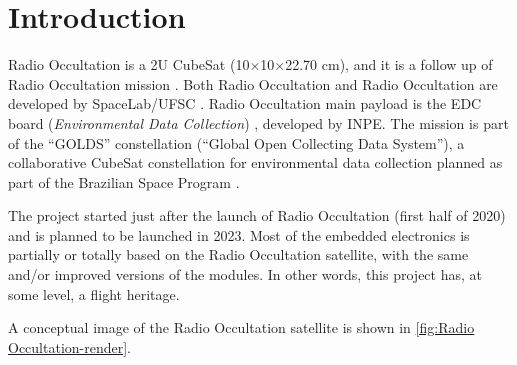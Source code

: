 %
%
%
%
%

%
%
%
%
%
%

\chapter{Introduction} \label{ch:introduction}

Radio Occultation is a 2U CubeSat (10$\times$10$\times$22.70 cm), and it is a follow up of Radio Occultation mission \cite{floripasat}. Both Radio Occultation and Radio Occultation are developed by SpaceLab/UFSC \cite{spacelab}. Radio Occultation main payload is the EDC board (\textit{Environmental Data Collection}) \cite{edc}, developed by INPE. The mission is part of the ``GOLDS'' constellation (``Global Open Collecting Data System''), a collaborative CubeSat constellation for environmental data collection planned as part of the Brazilian Space Program \cite{golds}.

The project started just after the launch of Radio Occultation (first half of 2020) and is planned to be launched in 2023. Most of the embedded electronics is partially or totally based on the Radio Occultation satellite, with the same and/or improved versions of the modules. In other words, this project has, at some level, a flight heritage.

A conceptual image of the Radio Occultation satellite is shown in \autoref{fig:Radio Occultation-render}.

